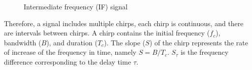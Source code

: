 \documentclass[12pt,DIV14,BCOR12mm,a4paper,footinclude=false,headinclude,parskip=half-,twoside,openright,cleardoublepage=empty,toc=index,bibliography=totoc,listof=totoc]{scrreprt}
\numberwithin{equation}{chapter}
\begin{document}
\begin{figure}
    \centering
    \begin{subfigure}{0.45\textwidth}
        \centering
    \end{subfigure}
    \begin{subfigure}{0.45\textwidth}
        \centering
    \end{subfigure}
    \caption{Intermediate frequency (IF) signal}
	\label{IF_signal}
\end{figure}

Therefore, a signal includes multiple chirps, each chirp is continuous, and there are intervals between chirps. A chirp contains the initial frequency ($f_c$), bandwidth ($B$), and duration ($T_c$). The slope ($S$) of the chirp represents the rate of increase of the frequency in time, namely $S=B/T_c$. $S_{\tau}$ is the frequency difference corresponding to the delay time $\tau$.
\end{document}
